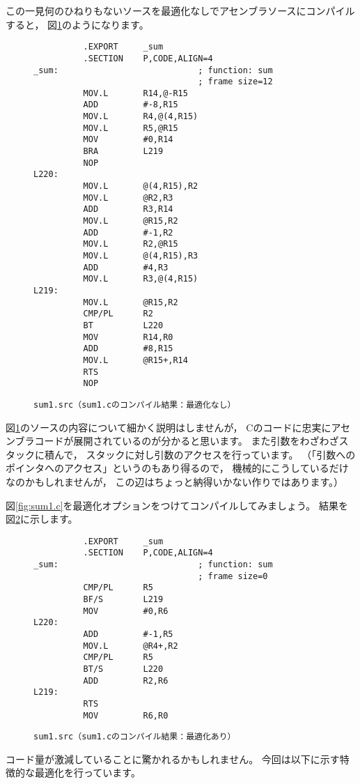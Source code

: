\documentclass[a4j,10pt,fleqn]{jsarticle}
\begin{document}
この一見何のひねりもないソースを最適化なしでアセンブラソースにコンパイルすると，
図\ref{fig:sum1.src}のようになります。
\begin{figure}[tpb]
\begin{boxnote}
{\small\begin{verbatim}
          .EXPORT     _sum
          .SECTION    P,CODE,ALIGN=4
_sum:                            ; function: sum
                                 ; frame size=12
          MOV.L       R14,@-R15
          ADD         #-8,R15
          MOV.L       R4,@(4,R15)
          MOV.L       R5,@R15
          MOV         #0,R14
          BRA         L219
          NOP
L220:
          MOV.L       @(4,R15),R2
          MOV.L       @R2,R3
          ADD         R3,R14
          MOV.L       @R15,R2
          ADD         #-1,R2
          MOV.L       R2,@R15
          MOV.L       @(4,R15),R3
          ADD         #4,R3
          MOV.L       R3,@(4,R15)
L219:
          MOV.L       @R15,R2
          CMP/PL      R2
          BT          L220
          MOV         R14,R0
          ADD         #8,R15
          MOV.L       @R15+,R14
          RTS
          NOP
\end{verbatim}}
\end{boxnote}
\caption{\texttt{sum1.src（sum1.cのコンパイル結果：最適化なし）}} \label{fig:sum1.src}
\end{figure}

図\ref{fig:sum1.src}のソースの内容について細かく説明はしませんが，
Cのコードに忠実にアセンブラコードが展開されているのが分かると思います。
また引数をわざわざスタックに積んで，
スタックに対し引数のアクセスを行っています。
（「引数へのポインタへのアクセス」というのもあり得るので，
機械的にこうしているだけなのかもしれませんが，
この辺はちょっと納得いかない作りではあります。）

図\ref{fig:sum1.c}を最適化オプションをつけてコンパイルしてみましょう。
結果を図\ref{fig:sum1_op.src}に示します。
\begin{figure}[tpb]
\begin{boxnote}
{\small\begin{verbatim}
          .EXPORT     _sum
          .SECTION    P,CODE,ALIGN=4
_sum:                            ; function: sum
                                 ; frame size=0
          CMP/PL      R5
          BF/S        L219
          MOV         #0,R6
L220:
          ADD         #-1,R5
          MOV.L       @R4+,R2
          CMP/PL      R5
          BT/S        L220
          ADD         R2,R6
L219:
          RTS
          MOV         R6,R0
\end{verbatim}}
\end{boxnote}
\caption{\texttt{sum1.src（sum1.cのコンパイル結果：最適化あり）}} \label{fig:sum1_op.src}
\end{figure}
コード量が激減していることに驚かれるかもしれません。
今回は以下に示す特徴的な最適化を行っています。
\end{document}
